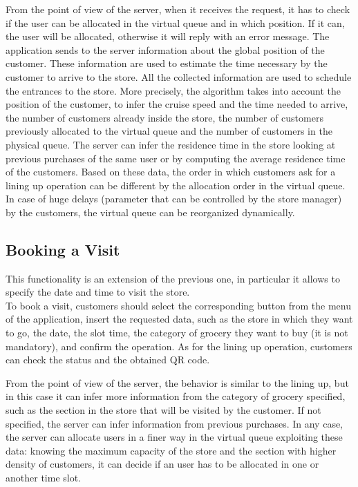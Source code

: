 From the point of view of the server, when it receives the request, it has to check if the user can be allocated in the virtual queue and in which position. If it can, the user will be allocated, otherwise it will reply with an error message.
The application sends to the server information about the global position of the customer. These information are used to estimate the time necessary by the customer to arrive to the store.
All the collected information are used to schedule the entrances to the store.
More precisely, the algorithm takes into account the position of the customer, to infer the cruise speed and the time needed to arrive, the number of customers already inside the store, the number of customers previously allocated to the virtual queue and the number of customers in the physical queue.
The server can infer the residence time in the store looking at previous purchases of the same user or by computing the average residence time of the customers.
Based on these data, the order in which customers ask for a lining up operation can be different by the allocation order in the virtual queue. In case of huge delays (parameter that can be controlled by the store manager) by the customers, the virtual queue can be reorganized dynamically.

\subsection{Booking a Visit}
This functionality is an extension of the previous one, in particular it allows to specify the date and time to visit the store.\\
To book a visit, customers should select the corresponding button from the menu of the application, insert the requested data, such as the store in which they want to go, the date, the slot time, the category of grocery they want to buy (it is not mandatory), and confirm the operation.
As for the lining up operation, customers can check the status and the obtained QR code.

From the point of view of the server, the behavior is similar to the lining up, but in this case it can infer more information from the category of grocery specified, such as the section in the store that will be visited by the customer. If not specified, the server can infer information from previous purchases.
In any case, the server can allocate users in a finer way in the virtual queue exploiting these data: knowing the maximum capacity of the store and the section with higher density of customers, it can decide if an user has to be allocated in one or another time slot.

